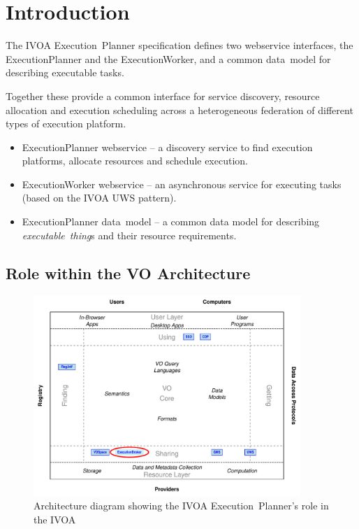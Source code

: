 \documentclass[11pt,a4paper]{ivoa}
\newcommand{\datamodel} {data~model}
\newcommand{\webservice} {webservice}
\newcommand{\ivoa} {IVOA}
\newcommand{\uws} {UWS}
\newcommand{\execplanner} {ExecutionPlanner}
\newcommand{\execworker} {ExecutionWorker}
\newcommand{\executionplanner} {Execution~Planner}
\newcommand{\executablething}  {\textit{executable~thing}}
\begin{document}
\section{Introduction}
\label{sec:introduction}

The \ivoa{} \executionplanner{} specification defines two \webservice{} interfaces,
the \execplanner{} and the \execworker{}, and a common \datamodel{} for describing
executable tasks.

Together these provide a common interface for service discovery, resource allocation
and execution scheduling across a heterogeneous federation of different types of
execution platform.

\begin{itemize}
    \item \execplanner{} \webservice{} – a discovery service to find execution platforms, allocate resources and schedule execution.
    \item \execworker{} \webservice{} – an asynchronous service for executing tasks (based on the \ivoa{} \uws{} pattern).
    \item \execplanner{} \datamodel{} – a common data model for describing \executablething{}s and their resource requirements.
\end{itemize}

\subsection{Role within the VO Architecture}
\label{subsec:ivoarole}

\begin{figure}
\centering
\includegraphics[width=0.9\textwidth]{role_diagram.pdf}
\caption{Architecture diagram showing the \ivoa{} \executionplanner{}'s role in the \ivoa}
\label{fig:archdiag}
\end{figure}
\end{document}
